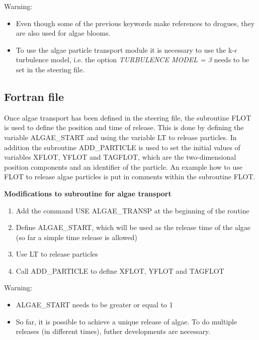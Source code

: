 \begin{WarningBlock}{Warning:}

\begin{itemize}
\item  Even though some of the previous keywords make references to drogues, they are also used for algae blooms.

\item  To use the algae particle transport module it is necessary to use the k-$\epsilon$ turbulence model, i.e. the option \textit{TURBULENCE MODEL = 3} needs to be set in the steering file.
\end{itemize}
\end{WarningBlock}

\subsection{Fortran file}

 Once algae transport has been defined in the steering file, the subroutine FLOT is used to define the position and time of release. This is done by defining the variable ALGAE\_START and using the variable LT to release particles. In addition the subroutine ADD\_PARTICLE is used to set the initial values of variables XFLOT, YFLOT and TAGFLOT, which are the two-dimensional position components and an identifier of the particle. An example how to use FLOT to release algae particles is put in comments within the subroutine FLOT.

 \textbf{Modifications to subroutine for algae transport}

\begin{enumerate}
\item Add the command USE ALGAE\_TRANSP at the beginning of the routine

\item  Define ALGAE\_START, which will be used as the release time of the algae (so far a simple time release is allowed)

\item  Use LT to release particles

\item  Call ADD\_PARTICLE to define XFLOT, YFLOT and TAGFLOT
\end{enumerate}

\begin{WarningBlock}{Warning:}
\begin{itemize}
\item  ALGAE\_START needs to be greater or equal to 1

\item  So far, it is possible to achieve a unique release of algae. To do multiple releases (in different times), futher developments are necessary.
\end{itemize}
\end{WarningBlock}

